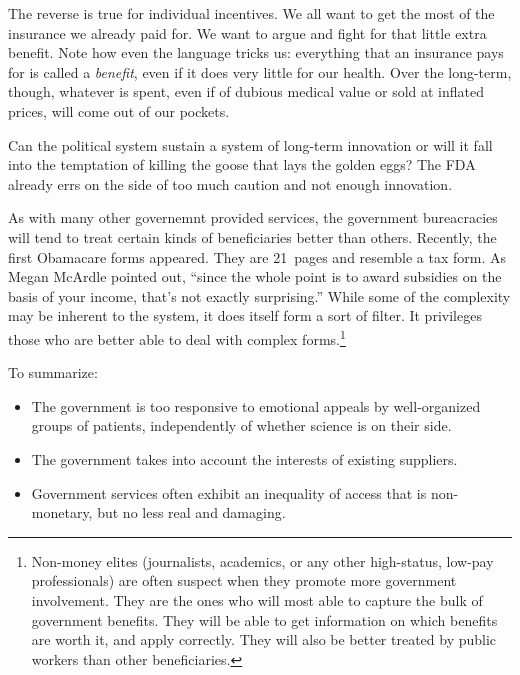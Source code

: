 The reverse is true for individual incentives. We all want to get the most of
the insurance we already paid for. We want to argue and fight for that little
extra benefit. Note how even the language tricks us: everything that an
insurance pays for is called a \emph{benefit}, even if it does very little for
our health. Over the long-term, though, whatever is spent, even if of dubious
medical value or sold at inflated prices, will come out of our pockets.

Can the political system sustain a system of long-term innovation or will it
fall into the temptation of killing the goose that lays the golden eggs? The
FDA already errs on the side of too much caution and not enough innovation.

As with many other governemnt provided services, the government bureacracies
will tend to treat certain kinds of beneficiaries better than others.
Recently, the first Obamacare forms appeared. They are 21~pages and resemble a
tax form. As Megan McArdle pointed out, ``since the whole point is to award
subsidies on the basis of your income, that's not exactly
surprising.''
While some of the complexity may be inherent to the system, it does itself form
a sort of filter. It privileges those who are better able to deal with complex
forms.\footnote{Non-money elites (journalists, academics, or any other
high-status, low-pay professionals) are often suspect when they promote more
government involvement. They are the ones who will most able to capture the
bulk of government benefits. They will be able to get information on which
benefits are worth it, and apply correctly. They will also be better treated by
public workers than other beneficiaries.}

To summarize:
\begin{itemize}
\item The government is too responsive to emotional appeals by well-organized
groups of patients, independently of whether science is on their side.
\item The government takes into account the interests of existing suppliers.
\item Government services often exhibit an inequality of access that is
non-monetary, but no less real and damaging.
\end{itemize}

